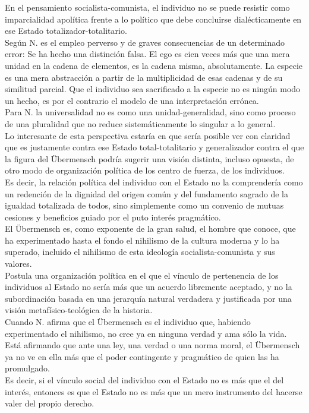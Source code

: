 \documentclass[a4paper, 10pt, twocolumn, spanish]{article}
\begin{document}
En el pensamiento socialista-comunista, el individuo no se puede
resistir como imparcialidad apolítica frente a lo político que debe
concluirse dialécticamente en ese Estado totalizador-totalitario.\\[0pt]
Según N. es el empleo perverso y de graves consecuencias de un
determinado error: Se ha hecho una distinción falsa. El ego es cien
veces más que una mera unidad en la cadena de elementos, es la cadena
misma, absolutamente. La especie es una mera abstracción a partir de
la multiplicidad de esas cadenas y de su similitud parcial. Que el
individuo sea sacrificado a la especie no es ningún modo un hecho, es
por el contrario el modelo de una interpretación errónea.\\[0pt]


Para N. la universalidad no es como una unidad-generalidad, sino como
proceso de una pluralidad que no reduce sistemáticamente lo singular a
lo general.\\[0pt]
Lo interesante de esta perspectiva estaría en que sería posible ver
con claridad que es justamente contra ese Estado total-totalitario y
generalizador contra el que la figura del Übermensch podría sugerir
una visión distinta, incluso opuesta, de otro modo de organización
política de los centro de fuerza, de los individuos.\\[0pt]
Es decir, la relación política del individuo con el Estado no la
comprendería como un redención de la dignidad del origen común y del
fundamento sagrado de la igualdad totalizada de todos, sino
simplemente como un convenio de mutuas cesiones y beneficios guiado
por el puto interés pragmático.\\[0pt]

El Übermensch es, como exponente de la gran salud, el hombre que
conoce, que ha experimentado hasta el fondo el nihilismo de la cultura
moderna y lo ha superado, incluido el nihilismo de esta ideología
socialista-comunista y sus valores.\\[0pt]
Postula una organización política en el que el vínculo de pertenencia
de los individuos al Estado no sería más que un acuerdo libremente
aceptado, y no la subordinación basada en una jerarquía natural
verdadera y justificada por una visión metafísico-teológica de la
historia.\\[0pt]

Cuando N. afirma que el Übermensch es el individuo que, habiendo
experimentado el nihilismo, no cree ya en ninguna verdad y ama sólo la
vida. Está afirmando que ante una ley, una verdad o una norma moral,
el Übermensch ya no ve en ella más que el poder contingente y
pragmático de quien las ha promulgado.\\[0pt]
Es decir, si el vínculo social del individuo con el Estado no es más
que el del interés, entonces es que el Estado no es más que un mero
instrumento del hacerse valer del propio derecho.\\[0pt]
\end{document}
